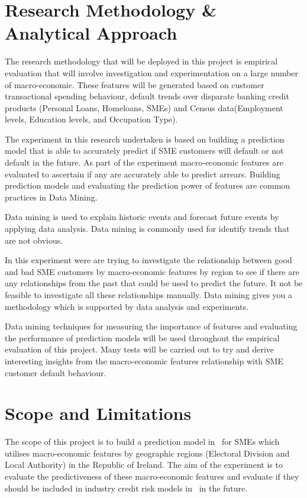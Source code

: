 \section{Research Methodology \& Analytical Approach}

The research methodology that will be deployed in this project is empirical evaluation that will involve investigation and experimentation on a large number of macro-economic. These features will be generated based on customer transactional spending behaviour, default trends over disparate banking credit products (Personal Loans, Homeloans, SMEs) and Census data(Employment levels, Education levels, and Occupation Type).   

The experiment in this research undertaken is based on building a prediction model that is able to accurately predict if SME customers will default or not default in the future. As part of the experiment macro-economic features are evaluated to ascertain if any are accurately able to predict arrears. Building prediction models and evaluating the prediction power of features are common practices in Data Mining.

Data mining is used to explain historic events and forecast future events by applying data analysis. Data mining is commonly used for identify trends that are not obvious. 

In this experiment were are trying to investigate the relationship between good and bad SME customers by macro-economic features by region to see if there are any relationships from the past that could be used to predict the future. It not be feasible to investigate all these relationships manually. Data mining gives you a methodology which is supported by data analysis and experiments. 

Data mining techniques for measuring the importance of features and evaluating the performance of prediction models will be used throughout the empirical evaluation of this project. Many tests will be carried out to try and derive interesting insights from the macro-economic features relationship with SME customer default behaviour.

\section{Scope and Limitations}
The scope of this project is to build a prediction model in \subjectname\ for SMEs which utilises macro-economic features by geographic regions (Electoral Division and Local Authority) in the Republic of Ireland. The aim of the experiment is to evaluate the predictiveness of these macro-economic features and evaluate if they should be included in industry credit risk models in \subjectname\ in the future.

